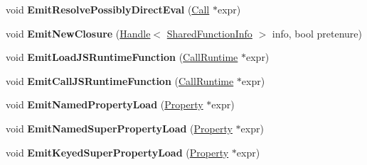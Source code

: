 \begin{DoxyCompactItemize}
\item 
void {\bfseries Emit\+Resolve\+Possibly\+Direct\+Eval} (\hyperlink{classv8_1_1internal_1_1_call}{Call} $\ast$expr)\hypertarget{classv8_1_1internal_1_1_full_code_generator_a3c2298922c14846f693fd563fbebb5a6}{}\label{classv8_1_1internal_1_1_full_code_generator_a3c2298922c14846f693fd563fbebb5a6}

\item 
void {\bfseries Emit\+New\+Closure} (\hyperlink{classv8_1_1internal_1_1_handle}{Handle}$<$ \hyperlink{classv8_1_1internal_1_1_shared_function_info}{Shared\+Function\+Info} $>$ info, bool pretenure)\hypertarget{classv8_1_1internal_1_1_full_code_generator_a1b13b55408ee1ca030a88ee4b373ca8a}{}\label{classv8_1_1internal_1_1_full_code_generator_a1b13b55408ee1ca030a88ee4b373ca8a}

\item 
void {\bfseries Emit\+Load\+J\+S\+Runtime\+Function} (\hyperlink{classv8_1_1internal_1_1_call_runtime}{Call\+Runtime} $\ast$expr)\hypertarget{classv8_1_1internal_1_1_full_code_generator_acf3bab96ecac6487be120663c2a04801}{}\label{classv8_1_1internal_1_1_full_code_generator_acf3bab96ecac6487be120663c2a04801}

\item 
void {\bfseries Emit\+Call\+J\+S\+Runtime\+Function} (\hyperlink{classv8_1_1internal_1_1_call_runtime}{Call\+Runtime} $\ast$expr)\hypertarget{classv8_1_1internal_1_1_full_code_generator_a10ef2cc5326190cfcfb76661e08ba343}{}\label{classv8_1_1internal_1_1_full_code_generator_a10ef2cc5326190cfcfb76661e08ba343}

\item 
void {\bfseries Emit\+Named\+Property\+Load} (\hyperlink{classv8_1_1internal_1_1_property}{Property} $\ast$expr)\hypertarget{classv8_1_1internal_1_1_full_code_generator_a7c2867d65435f7134f784d22fe4db0f6}{}\label{classv8_1_1internal_1_1_full_code_generator_a7c2867d65435f7134f784d22fe4db0f6}

\item 
void {\bfseries Emit\+Named\+Super\+Property\+Load} (\hyperlink{classv8_1_1internal_1_1_property}{Property} $\ast$expr)\hypertarget{classv8_1_1internal_1_1_full_code_generator_a5bf26976134c0084c304ae007619a619}{}\label{classv8_1_1internal_1_1_full_code_generator_a5bf26976134c0084c304ae007619a619}

\item 
void {\bfseries Emit\+Keyed\+Super\+Property\+Load} (\hyperlink{classv8_1_1internal_1_1_property}{Property} $\ast$expr)\hypertarget{classv8_1_1internal_1_1_full_code_generator_a954d5b24fc36e77b7b5f312369cbe9fc}{}\label{classv8_1_1internal_1_1_full_code_generator_a954d5b24fc36e77b7b5f312369cbe9fc}


\end{DoxyCompactItemize}
